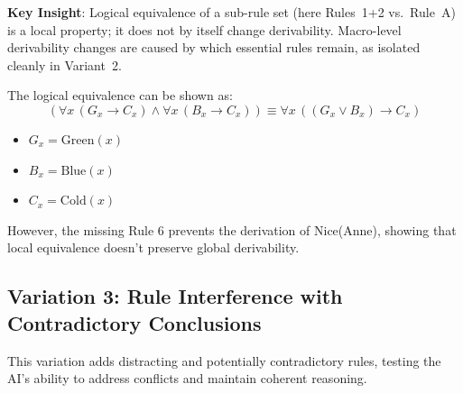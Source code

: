 \documentclass{article}
\begin{document}
\textbf{Key Insight}: Logical equivalence of a sub-rule set (here Rules~1+2 vs.\ Rule~A) is a local property; it does not by itself change derivability. Macro-level derivability changes are caused by which essential rules remain, as isolated cleanly in Variant~2.

The logical equivalence can be shown as:
\[
(\forall x \, (G_x \rightarrow C_x) \land \forall x \, (B_x \rightarrow C_x))
\equiv
\forall x \, ((G_x \lor B_x) \rightarrow C_x)
\]

\begin{itemize}
    \item $G_x = \mathrm{Green}(x)$
    \item $B_x = \mathrm{Blue}(x)$
    \item $C_x = \mathrm{Cold}(x)$
\end{itemize}


However, the missing Rule 6 prevents the derivation of Nice(Anne), showing that local equivalence doesn't preserve global derivability.

\subsection{Variation 3: Rule Interference with Contradictory Conclusions}

This variation adds distracting and potentially contradictory rules, testing the AI's ability to address conflicts and maintain coherent reasoning.
\end{document}
